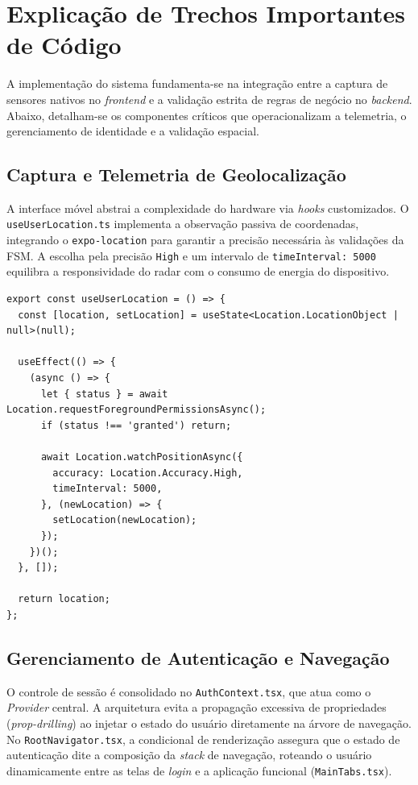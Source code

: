 \chapter{Explicação de Trechos Importantes de Código}

A implementação do sistema fundamenta-se na integração entre a captura de sensores nativos no \textit{frontend} e a validação estrita de regras de negócio no \textit{backend}. Abaixo, detalham-se os componentes críticos que operacionalizam a telemetria, o gerenciamento de identidade e a validação espacial.

\section{Captura e Telemetria de Geolocalização}

A interface móvel abstrai a complexidade do hardware via \textit{hooks} customizados. O \texttt{useUserLocation.ts} implementa a observação passiva de coordenadas, integrando o \texttt{expo-location} para garantir a precisão necessária às validações da FSM. A escolha pela precisão \texttt{High} e um intervalo de \texttt{timeInterval: 5000} equilibra a responsividade do radar com o consumo de energia do dispositivo.

\begin{lstlisting}[style=estiloJS, caption={Hook de telemetria para captura de geolocalização}]
export const useUserLocation = () => {
  const [location, setLocation] = useState<Location.LocationObject | null>(null);

  useEffect(() => {
    (async () => {
      let { status } = await Location.requestForegroundPermissionsAsync();
      if (status !== 'granted') return;

      await Location.watchPositionAsync({
        accuracy: Location.Accuracy.High,
        timeInterval: 5000,
      }, (newLocation) => {
        setLocation(newLocation);
      });
    })();
  }, []);

  return location;
};
\end{lstlisting}

\section{Gerenciamento de Autenticação e Navegação}

O controle de sessão é consolidado no \texttt{AuthContext.tsx}, que atua como o \textit{Provider} central. A arquitetura evita a propagação excessiva de propriedades (\textit{prop-drilling}) ao injetar o estado do usuário diretamente na árvore de navegação. No \texttt{RootNavigator.tsx}, a condicional de renderização assegura que o estado de autenticação dite a composição da \textit{stack} de navegação, roteando o usuário dinamicamente entre as telas de \textit{login} e a aplicação funcional (\texttt{MainTabs.tsx}).

